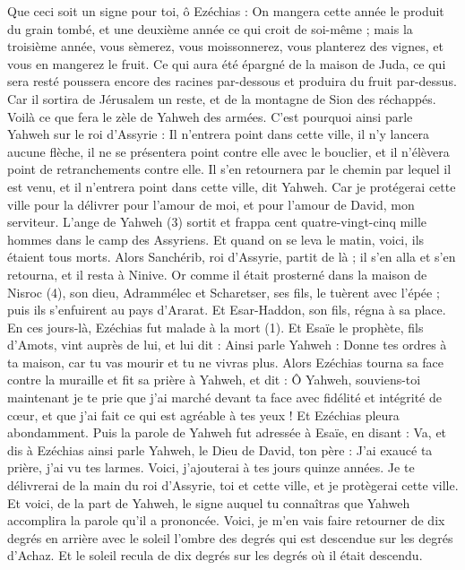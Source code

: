 \begin{multicols}{2}
Que ceci soit un signe pour toi, ô Ezéchias : On mangera cette année le produit du grain tombé, et une deuxième année ce qui croit de soi-même ; mais la troisième année, vous sèmerez, vous moissonnerez, vous planterez des vignes, et vous en mangerez le fruit.
Ce qui aura été épargné de la maison de Juda, ce qui sera resté poussera encore des racines par-dessous et produira du fruit par-dessus.
Car il sortira de Jérusalem un reste, et de la montagne de Sion des réchappés. Voilà ce que fera le zèle de Yahweh des armées.
C'est pourquoi ainsi parle Yahweh sur le roi d’Assyrie : Il n'entrera point dans cette ville, il n'y lancera aucune flèche, il ne se présentera point contre elle avec le bouclier, et il n’élèvera point de retranchements contre elle.
Il s'en retournera par le chemin par lequel il est venu, et il n'entrera point dans cette ville, dit Yahweh.
Car je protégerai cette ville pour la délivrer pour l'amour de moi, et pour l'amour de David, mon serviteur.
L’ange de Yahweh (3) sortit et frappa cent quatre-vingt-cinq mille hommes dans le camp des Assyriens. Et quand on se leva le matin, voici, ils étaient tous morts.
Alors Sanchérib, roi d’Assyrie, partit de là ; il s'en alla et s'en retourna, et il resta à Ninive.
Or comme il était prosterné dans la maison de Nisroc (4), son dieu, Adrammélec et Scharetser, ses fils, le tuèrent avec l'épée ; puis ils s’enfuirent au pays d'Ararat. Et Esar-Haddon, son fils, régna à sa place.
\VerseOne{}En ces jours-là, Ezéchias fut malade à la mort (1). Et Esaïe le prophète, fils d'Amots, vint auprès de lui, et lui dit : Ainsi parle Yahweh : Donne tes ordres à ta maison, car tu vas mourir et tu ne vivras plus.
Alors Ezéchias tourna sa face contre la muraille et fit sa prière à Yahweh,
et dit : Ô Yahweh, souviens-toi maintenant je te prie que j'ai marché devant ta face avec fidélité et intégrité de cœur, et que j'ai fait ce qui est agréable à tes yeux ! Et Ezéchias pleura abondamment.
Puis la parole de Yahweh fut adressée à Esaïe, en disant :
Va, et dis à Ezéchias ainsi parle Yahweh, le Dieu de David, ton père : J'ai exaucé ta prière, j'ai vu tes larmes. Voici, j’ajouterai à tes jours quinze années.
Je te délivrerai de la main du roi d’Assyrie, toi et cette ville, et je protègerai cette ville.
Et voici, de la part de Yahweh, le signe auquel tu connaîtras que Yahweh accomplira la parole qu'il a prononcée.
Voici, je m’en vais faire retourner de dix degrés en arrière avec le soleil l'ombre des degrés qui est descendue sur les degrés d'Achaz. Et le soleil recula de dix degrés sur les degrés où il était descendu.

\end{multicols}
